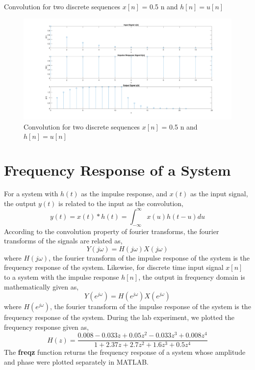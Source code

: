\documentclass{article}
\begin{document}
Convolution for two discrete sequences $x[n]$ = 0.5 n and $h[n] = u[n]$


\begin{figure}[H]
    \centering
    \includegraphics[scale=0.55,cframe=blue 0.5pt 3pt]{./FIG/Conv2}
    \caption{Convolution for two discrete sequences $x[n]$ = 0.5 n and $h[n] = u[n]$ }
\end{figure}


\section{Frequency Response of a System}
For a system with $h(t)$ as the impulse response, and $x(t)$ as the input signal, the output $y(t)$ is related to the input as the convolution,
$$
    y(t)=x(t)*h(t)=\int_{-\infty}^{\infty}x(u)h(t-u)du
$$
According to the convolution property of fourier transforms, the fourier transforms of the signals are related as,
$$
    Y(j\omega)=H(j\omega)X(j\omega)
$$
where $H(j\omega)$, the fourier transform of the impulse response of the system is the frequency response of the system. Likewise, for discrete time input signal $x[n]$ to a system with the impulse response $h[n]$, the output in frequency domain is mathematically given as,
$$
    Y(e^{j\omega})=H(e^{j\omega})X(e^{j\omega})
$$
where $H(e^{j\omega})$, the fourier transform of the impulse response of the system is the frequency response of the system.
During the lab experiment, we plotted the frequency response given as,
$$
    H(z)=\frac{0.008-0.033z+0.05z^2-0.033z^3+0.008z^4}{1+2.37z+2.7z^2+1.6z^3+0.5z^4}
$$
The \textbf{freqz} function returns the frequency response of a system whose amplitude and phase were plotted separately in MATLAB.
\end{document}
